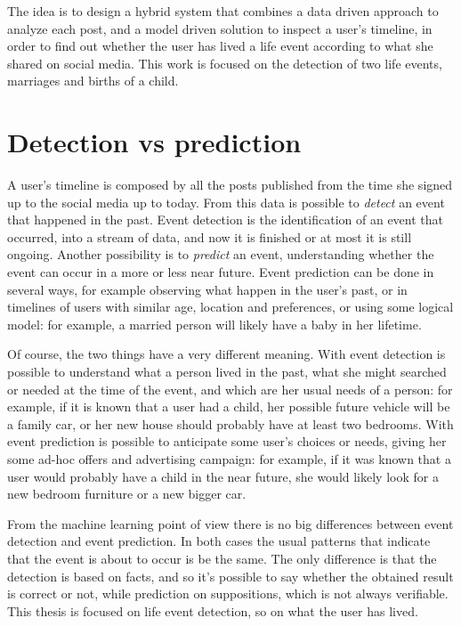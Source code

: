 The idea is to design a hybrid system that combines a data driven approach to analyze each post, and a model driven solution to inspect a user's timeline, in order to find out whether the user has lived a life event according to what she shared on social media. This work is focused on the detection of two life events, marriages and births of a child.

\section{Detection vs prediction}

A user's timeline is composed by all the posts published from the time she signed up to the social media up to today. From this data is possible to \emph{detect} an event that happened in the past. Event detection is the identification of an event that occurred, into a stream of data, and now it is finished or at most it is still ongoing. Another possibility is to \emph{predict} an event, understanding whether the event can occur in a more or less near future. Event prediction can be done in several ways, for example observing what happen in the user's past, or in timelines of users with similar age, location and preferences, or using some logical model: for example, a married person will likely have a baby in her lifetime.

Of course, the two things have a very different meaning. With event detection is possible to understand what a person lived in the past, what she might searched or needed at the time of the event, and which are her usual needs of a person: for example, if it is known that a user had a child, her possible future vehicle will be a family car, or her new house should probably have at least two bedrooms. With event prediction is possible to anticipate some user's choices or needs, giving her some ad-hoc offers and advertising campaign: for example, if it was known that a user would probably have a child in the near future, she would likely look for a new bedroom furniture or a new bigger car.

From the machine learning point of view there is no big differences between event detection and event prediction. In both cases the usual patterns that indicate that the event is about to occur is be the same. The only difference is that the detection is based on facts, and so it's possible to say whether the obtained result is correct or not, while prediction on suppositions, which is not always verifiable. This thesis is focused on life event detection, so on what the user has lived.

